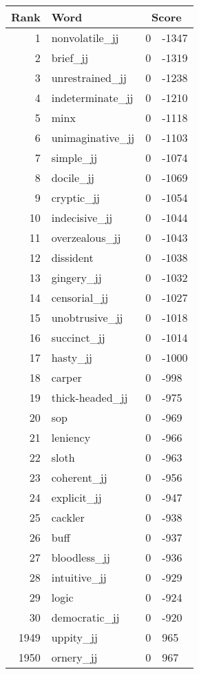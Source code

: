 \begin{longtable}[!htbp]{| rlr@{.}l |}
    \hline
    \textbf{Rank} & \textbf{Word} & \multicolumn{2}{c|}{\textbf{Score}} \\
    \hline
    \endhead
    1 & nonvolatile\_jj & 0 & -1347 \\
    2 & brief\_jj & 0 & -1319 \\
    3 & unrestrained\_jj & 0 & -1238 \\
    4 & indeterminate\_jj & 0 & -1210 \\
    5 & minx & 0 & -1118 \\
    6 & unimaginative\_jj & 0 & -1103 \\
    7 & simple\_jj & 0 & -1074 \\
    8 & docile\_jj & 0 & -1069 \\
    9 & cryptic\_jj & 0 & -1054 \\
    10 & indecisive\_jj & 0 & -1044 \\
    11 & overzealous\_jj & 0 & -1043 \\
    12 & dissident & 0 & -1038 \\
    13 & gingery\_jj & 0 & -1032 \\
    14 & censorial\_jj & 0 & -1027 \\
    15 & unobtrusive\_jj & 0 & -1018 \\
    16 & succinct\_jj & 0 & -1014 \\
    17 & hasty\_jj & 0 & -1000 \\
    18 & carper & 0 & -998 \\
    19 & thick-headed\_jj & 0 & -975 \\
    20 & sop & 0 & -969 \\
    21 & leniency & 0 & -966 \\
    22 & sloth & 0 & -963 \\
    23 & coherent\_jj & 0 & -956 \\
    24 & explicit\_jj & 0 & -947 \\
    25 & cackler & 0 & -938 \\
    26 & buff & 0 & -937 \\
    27 & bloodless\_jj & 0 & -936 \\
    28 & intuitive\_jj & 0 & -929 \\
    29 & logic & 0 & -924 \\
    30 & democratic\_jj & 0 & -920 \\
    1949 & uppity\_jj & 0 & 965 \\
    1950 & ornery\_jj & 0 & 967 \\

\end{longtable}
